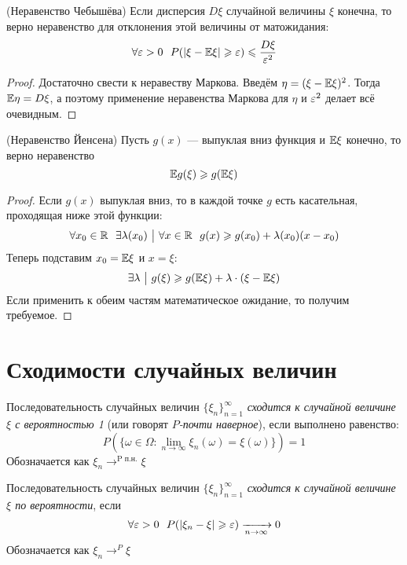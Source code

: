 \begin{proposition} (Неравенство Чебышёва)
	Если дисперсия $D\xi$ случайной величины $\xi$ конечна, то верно неравенство для отклонения этой величины от матожидания:
	\[
		\forall \varepsilon > 0\ \ P(|\xi - \mathbb{E}\xi| \geqslant \varepsilon) \leqslant \frac{D\xi}{\varepsilon^2}
	\]
\end{proposition}

\begin{proof}
	Достаточно свести к неравеству Маркова. Введём $\eta = (\xi - \mathbb{E}\xi)^2$. Тогда $\mathbb{E}\eta = D\xi$, а поэтому применение неравенства Маркова для $\eta$ и $\varepsilon^2$ делает всё очевидным.
\end{proof}

\begin{proposition} (Неравенство Йенсена)
	Пусть $g(x)$ --- выпуклая вниз функция и $\mathbb{E}\xi$ конечно, то верно неравенство
	\[
		\mathbb{E} g(\xi) \geqslant g(\mathbb{E}\xi)
	\]
\end{proposition}

\begin{proof}
	Если $g(x)$ выпуклая вниз, то в каждой точке $g$ есть касательная, проходящая ниже этой функции:
	\[
		\forall x_0 \in \mathbb{R}\ \ \exists \lambda(x_0) \ \big|\  \forall x \in \mathbb{R}\ \ g(x) \geqslant g(x_0) + \lambda(x_0)(x - x_0)
	\]
	Теперь подставим $x_0 = \mathbb{E}\xi$ и $x = \xi$:
	\[
		\exists \lambda \ \big|\  g(\xi) \geqslant g(\mathbb{E}\xi) + \lambda \cdot (\xi - \mathbb{E}\xi)
	\]
	Если применить к обеим частям математическое ожидание, то получим требуемое.
\end{proof}

\section{Сходимости случайных величин}

\begin{definition}
	Последовательность случайных величин $\{\xi_n\}_{n = 1}^\infty$ \textit{сходится к случайной величине $\xi$ с вероятностью 1} (или говорят $P$\textit{-почти наверное}), если выполнено равенство:
	\[
		P(\{\omega \in \Omega \colon \lim_{n \to \infty} \xi_n(\omega) = \xi(\omega)\}) = 1
	\]
	Обозначается как $\xi_n \to^{\text{P п.н.}} \xi$
\end{definition}

\begin{definition}
	Последовательность случайных величин $\{\xi_n\}_{n = 1}^\infty$ \textit{сходится к случайной величине $\xi$ по вероятности}, если
	\[
		\forall \varepsilon > 0\ \ P(|\xi_n - \xi| \geqslant \varepsilon) \xrightarrow[n \to \infty]{} 0
	\]
	Обозначается как $\xi_n \to^P \xi$
\end{definition}


